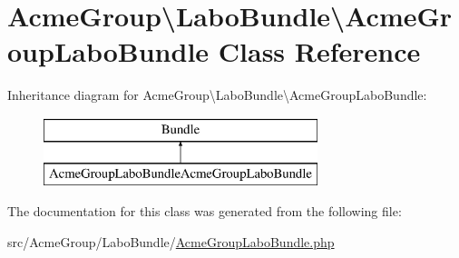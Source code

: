 \hypertarget{class_acme_group_1_1_labo_bundle_1_1_acme_group_labo_bundle}{\section{Acme\+Group\textbackslash{}Labo\+Bundle\textbackslash{}Acme\+Group\+Labo\+Bundle Class Reference}
\label{class_acme_group_1_1_labo_bundle_1_1_acme_group_labo_bundle}
}
Inheritance diagram for Acme\+Group\textbackslash{}Labo\+Bundle\textbackslash{}Acme\+Group\+Labo\+Bundle\+:\begin{figure}[H]
\begin{center}
\leavevmode
\includegraphics[height=2.000000cm]{class_acme_group_1_1_labo_bundle_1_1_acme_group_labo_bundle}
\end{center}
\end{figure}


The documentation for this class was generated from the following file\+:\begin{DoxyCompactItemize}
\item 
src/\+Acme\+Group/\+Labo\+Bundle/\hyperlink{_acme_group_labo_bundle_8php}{Acme\+Group\+Labo\+Bundle.\+php}\end{DoxyCompactItemize}
